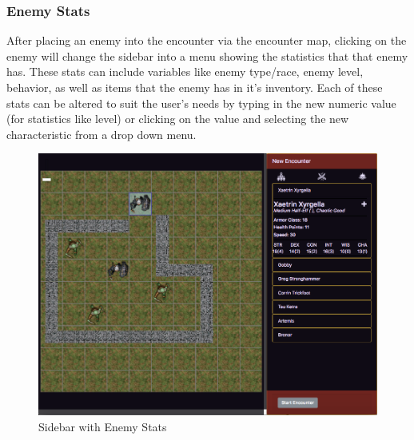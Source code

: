 \documentclass[12pt,a4paper]{report}
\begin{document}
			\subsubsection{Enemy Stats}
			After placing an enemy into the encounter via the encounter map, clicking on the enemy will change the sidebar into a menu showing the statistics that that enemy has. These stats can include variables like enemy type/race, enemy level, behavior, as well as items that the enemy has in it's inventory. Each of these stats can be altered to suit the user's needs by typing in the new numeric value (for statistics like level) or clicking on the value and selecting the new characteristic from a drop down menu.
			\bigskip
			\begin{figure}[H]
				\centering
				\includegraphics[scale=.4]{sidebarenemystats}
				\caption{Sidebar with Enemy Stats}
				\label{fig: Sidebar with Enemy Stats}
			\end{figure}
			\newpage
\end{document}
